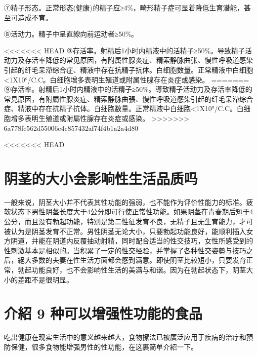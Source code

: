 \documentclass[12pt,UTF8]{ctexbook}
\begin{document}
⑦精子形态。正常形态(健康)的精子应≥4\%，畸形精子症可显着降低生育潛能，甚至可造成不育。

⑧活动力。精子中呈直線向前运动者≥50\%。

<<<<<<< HEAD
⑨存活率。射精后1小时内精液中的活精子≥50\%。导致精子活动力及存活率降低的常见原因，有附属性腺炎症、精索静脉曲张、慢性呼吸道感染引起的纤毛呆滯综合症、精液中存在抗精子抗体。白细胞数量。正常精液中白细胞<1X10°/C.C。白细胞增多表明生殖道或附属性腺存在炎症或感染。
=======
⑨存活率。射精后1小时内精液中的活精子≥50\%。導致精子活动力及存活率降低的常見原因，有附屬性腺炎症、精索静脉曲張、慢性呼吸道感染引起的纤毛呆滯综合症、精液中存在抗精子抗体。白细胞数量。正常精液中白细胞<1X10°/C.C。白细胞增多表明生殖道或附屬性腺存在炎症或感染。
>>>>>>> 6a778fc562d55006c4c857432af74f4b1a2a4d80


<<<<<<< HEAD

\section{阴茎的大小会影响性生活品质吗}

一般来说，阴茎大小并不代表其性功能的强弱，也不能作为评价性能力的标准。疲软状态下男性阴茎长度大于4公分即可行使正常性功能。如果阴茎在青春期后短于4公分，而且没有勃起功能，特別是第二性征发育不良，无精子且无生育能力，才可被认为是阴茎发育不正常。男性阴茎无论大小，只要勃起功能良好，能顺利插入女方阴道，并能在阴道内反覆抽动射精，同时配合适当的性交技巧，女性所感受到的性刺激基本是相似的。当积累了一定的性交经验，并掌握了各种性交姿勢与技巧之后，絕大多数的夫妻在性生活方面都会感到满意。即使阴茎比较短小，只要发育正常，勃起功能良好，也不会影响性生活的美满与和谐。因为在勃起状态下，阴茎大小的差距不是很明显。

\section{介紹 9 种可以增强性功能的食品}

吃出健康在现实生活中的意义越来越大，食物撩法已被廣泛应用于疾病的治疗和預防保健，很多食物能增强男性的性功能，在这裹简单介紹一下。
\end{document}
